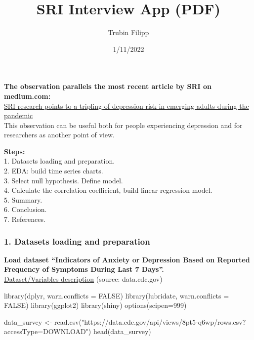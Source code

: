 \documentclass[
]{article}
\title{SRI Interview App (PDF)}
\author{Trubin Filipp}
\date{1/11/2022}
\newenvironment{Shaded}{\begin{snugshade}}{\end{snugshade}}
\newcommand{\AttributeTok}[1]{\textcolor[rgb]{0.77,0.63,0.00}{#1}}
\newcommand{\ConstantTok}[1]{\textcolor[rgb]{0.00,0.00,0.00}{#1}}
\newcommand{\DecValTok}[1]{\textcolor[rgb]{0.00,0.00,0.81}{#1}}
\newcommand{\FunctionTok}[1]{\textcolor[rgb]{0.00,0.00,0.00}{#1}}
\newcommand{\NormalTok}[1]{#1}
\newcommand{\OtherTok}[1]{\textcolor[rgb]{0.56,0.35,0.01}{#1}}
\newcommand{\StringTok}[1]{\textcolor[rgb]{0.31,0.60,0.02}{#1}}
\begin{document}
\maketitle

\textbf{The observation parallels the most recent article by SRI on
medium.com:}\\
\href{https://medium.com/dish/sri-research-points-to-a-tripling-of-depression-risk-in-emerging-adults-during-the-pandemic-c39819c00946}{SRI
research points to a tripling of depression risk in emerging adults
during the pandemic}\\
This observation can be useful both for people experiencing depression
and for researchers as another point of view.

\textbf{Steps:}\\
1. Datasets loading and preparation.\\
2. EDA: build time series charts.\\
3. Select null hypothesis. Define model.\\
4. Calculate the correlation coefficient, build linear regression
model.\\
5. Summary.\\
6. Conclusion.\\
7. References.

\hypertarget{datasets-loading-and-preparation}{%
\subsubsection{1. Datasets loading and
preparation}\label{datasets-loading-and-preparation}}

\textbf{Load dataset ``Indicators of Anxiety or Depression Based on
Reported Frequency of Symptoms During Last 7 Days''.}\\
\href{https://data.cdc.gov/NCHS/Indicators-of-Anxiety-or-Depression-Based-on-Repor/8pt5-q6wp}{Dataset/Variables
description} (source: data.cdc.gov)

\begin{Shaded}
\begin{Highlighting}[]
\FunctionTok{library}\NormalTok{(dplyr, }\AttributeTok{warn.conflicts =} \ConstantTok{FALSE}\NormalTok{)}
\FunctionTok{library}\NormalTok{(lubridate, }\AttributeTok{warn.conflicts =} \ConstantTok{FALSE}\NormalTok{)}
\FunctionTok{library}\NormalTok{(ggplot2)}
\FunctionTok{library}\NormalTok{(shiny)}
\FunctionTok{options}\NormalTok{(}\AttributeTok{scipen=}\DecValTok{999}\NormalTok{) }

\NormalTok{data\_survey }\OtherTok{\textless{}{-}} \FunctionTok{read.csv}\NormalTok{(}\StringTok{"https://data.cdc.gov/api/views/8pt5{-}q6wp/rows.csv?accessType=DOWNLOAD"}\NormalTok{)}
\FunctionTok{head}\NormalTok{(data\_survey)}
\end{Highlighting}
\end{Shaded}
\end{document}
